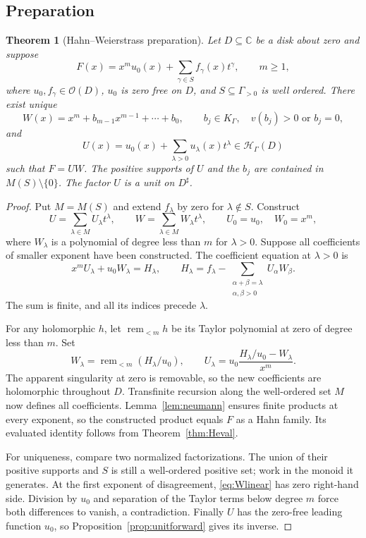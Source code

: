 \documentclass[11pt,a4paper]{article}
\newtheorem{theorem}{Theorem}[section]
\theoremstyle{definition}
\theoremstyle{remark}
\newcommand{\C}{\mathbb C}
\newcommand{\OO}{\mathcal O}
\newcommand{\HH}{\mathcal H}
\newcommand{\remm}{\operatorname{rem}_{<m}}
\begin{document}
\subsection{Preparation}
\begin{theorem}[Hahn--Weierstrass preparation]\label{thm:Wprep}
Let $D\subseteq\C$ be a disk about zero and suppose
\begin{equation}\label{eq:Winput}
 F(x)=x^m u_0(x)+\sum_{\gamma\in S} f_\gamma(x)t^\gamma,
 \qquad m\ge1,
\end{equation}
where $u_0,f_\gamma\in\OO(D)$, $u_0$ is zero free on $D$, and
$S\subseteq\Gamma_{>0}$ is well ordered. There exist unique
\[
 W(x)=x^m+b_{m-1}x^{m-1}+\cdots+b_0,
 \qquad b_j\in K_\Gamma,\quad v(b_j)>0\text{ or }b_j=0,
\]
and
\[
 U(x)=u_0(x)+\sum_{\lambda>0}u_\lambda(x)t^\lambda
       \in\HH_\Gamma(D)
\]
such that $F=UW$. The positive supports of $U$ and the $b_j$ are
contained in $M(S)\setminus\{0\}$. The factor $U$ is a unit on
$D^\sharp$.
\end{theorem}
\begin{proof}
Put $M=M(S)$ and extend $f_\lambda$ by zero for
$\lambda\notin S$. Construct
\[
 U=\sum_{\lambda\in M}U_\lambda t^\lambda,
 \qquad W=\sum_{\lambda\in M}W_\lambda t^\lambda,
 \qquad U_0=u_0,\quad W_0=x^m,
\]
where $W_\lambda$ is a polynomial of degree less than $m$ for
$\lambda>0$. Suppose all coefficients of smaller exponent have been
constructed. The coefficient equation at $\lambda>0$ is
\begin{equation}\label{eq:Wlinear}
 x^mU_\lambda+u_0W_\lambda=H_\lambda,
 \qquad
 H_\lambda=f_\lambda-
 \sum_{\substack{\alpha+\beta=\lambda\\\alpha,\beta>0}}
 U_\alpha W_\beta.
\end{equation}
The sum is finite, and all its indices precede $\lambda$.

For any holomorphic $h$, let $\remm h$ be its Taylor polynomial at
zero of degree less than $m$. Set
\begin{equation}\label{eq:Wrecursion}
 W_\lambda=\remm(H_\lambda/u_0),\qquad
 U_\lambda=u_0\frac{H_\lambda/u_0-W_\lambda}{x^m}.
\end{equation}
The apparent singularity at zero is removable, so the new
coefficients are holomorphic throughout $D$. Transfinite recursion
along the well-ordered set $M$ now defines all coefficients.
Lemma~\ref{lem:neumann} ensures finite products at every exponent,
so the constructed product equals $F$ as a Hahn family. Its evaluated
identity follows from Theorem~\ref{thm:Heval}.

For uniqueness, compare two normalized factorizations. The union of
their positive supports and $S$ is still a well-ordered positive set;
work in the monoid it generates. At the first exponent of disagreement,
\eqref{eq:Wlinear} has zero right-hand side. Division by $u_0$ and
separation of the Taylor terms below degree $m$ force both differences
to vanish, a contradiction. Finally $U$ has the zero-free leading
function $u_0$, so Proposition~\ref{prop:unitforward} gives its inverse.
\end{proof}
\end{document}
